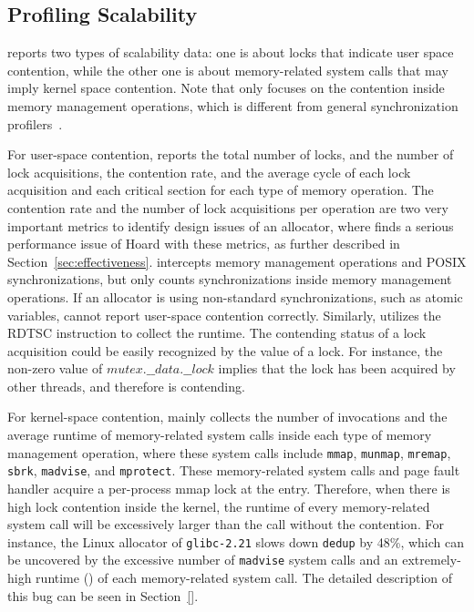\subsection{Profiling Scalability}
\label{sec:profilingscale}

\MP{} reports two types of scalability data: one is about locks that indicate user space contention, while the other one is about memory-related system calls that may imply kernel space contention. Note that \MP{} only focuses on the contention inside memory management operations, which is different from general synchronization profilers~\cite{SyncProf, SyncPerf}.

For user-space contention, \MP{} reports the total number of locks, and the number of lock acquisitions, the contention rate, and the average cycle of each lock acquisition and each critical section for each type of memory operation. The contention rate and the number of lock acquisitions per operation are two very important metrics to identify design issues of an allocator, where \MP{} finds a serious performance issue of Hoard with these metrics, as further described in Section~\ref{sec:effectiveness}.  \MP{} intercepts memory management operations and POSIX synchronizations, but only counts synchronizations inside memory management operations. If an allocator is using non-standard synchronizations, such as atomic variables, \MP{} cannot report user-space contention correctly. Similarly, \MP{} utilizes the RDTSC instruction to collect the runtime. The contending status of a lock acquisition could be easily recognized by the value of a lock. For instance, the non-zero value of $mutex.\_\_data.\_\_lock$ implies that the lock has been acquired by other threads, and therefore is contending. 


For kernel-space contention, \MP{} mainly collects the number of invocations and the average runtime of memory-related system calls inside each type of memory management operation, where these system calls include \texttt{mmap}, \texttt{munmap}, \texttt{mremap}, \texttt{sbrk}, \texttt{madvise}, and \texttt{mprotect}. These memory-related system calls and page fault handler acquire a per-process mmap lock at the entry. Therefore, when there is high lock contention inside the kernel, the runtime of every memory-related system call will be excessively larger than the call without the contention. For instance, the Linux allocator of \texttt{glibc-2.21} slows down \texttt{dedup} by 48\%, which can be uncovered by the excessive number of \texttt{madvise} system calls and an extremely-high runtime () of each memory-related system call. The detailed description of this bug can be seen in Section~\ref{}.  



